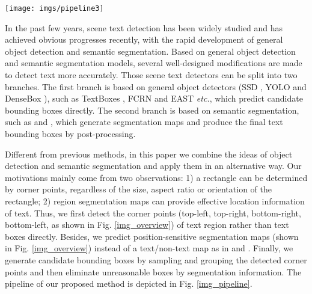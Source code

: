 \documentclass[10pt,twocolumn,letterpaper]{article}
\begin{document}
\begin{figure*}
\vspace{-2mm}
\begin{centering}
\texttt{[image: imgs/pipeline3]}
\par\end{centering}
\caption{Overview of our method. Given an image, the network outputs corner points and segmentation maps by corner detection and position-sensitive segmentation. Then candidate boxes are generated by sampling and grouping corner points. Finally, those candidate boxes are scored by segmentation maps and suppressed by NMS.}
\label{img_pipeline}
\end{figure*}
In the past few years, scene text detection has been widely studied \cite{epshtein2010detecting, bissacco2013photoocr,yao2012detecting,jaderberg2014deep,tian2015text,zhang2016multi,Shi_2017_CVPR,tian2017wetext} and has achieved obvious progresses recently, with the rapid development of general object detection and semantic segmentation. Based on general object detection and semantic segmentation models, several well-designed modifications are made to detect text more accurately. Those scene text detectors can be split into two branches. The first branch is based on general object detectors (SSD \cite{liu2016ssd}, YOLO \cite{redmon2016you} and DenseBox \cite{huang2015densebox}), such as TextBoxes \cite{liao2017textboxes}, FCRN \cite{gupta2016synthetic}  and EAST \cite{Zhou_2017_CVPR} \emph{etc.}, which predict candidate bounding boxes directly. The second branch is based on semantic segmentation, such as \cite{zhang2016multi} and \cite{yao2016scene}, which generate segmentation maps and produce the final text bounding boxes by post-processing.

Different from previous methods, in this paper we combine the ideas of object detection and semantic segmentation and apply them in an alternative way. Our motivations mainly come from two observations: 1) a rectangle can be determined by corner points, regardless of the size, aspect ratio or orientation of the rectangle; 2) region segmentation maps can provide effective location information of text. Thus, we first detect the corner points (top-left, top-right, bottom-right, bottom-left, as shown in Fig. \ref{img_overview}) of text region rather than text boxes directly. Besides, we predict position-sensitive segmentation maps (shown in Fig. \ref{img_overview}) instead of a text/non-text map as in \cite{zhang2016multi} and \cite{yao2016scene}. Finally, we generate candidate bounding boxes by sampling and grouping the detected corner points and then eliminate unreasonable boxes by segmentation information. The pipeline of our proposed method is depicted in Fig. \ref{img_pipeline}.
\end{document}
